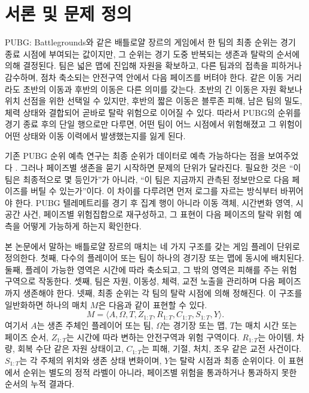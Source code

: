 \section{서론 및 문제 정의}
\label{sec:problem}

PUBG: Battlegrounds와 같은 배틀로얄 장르의 게임에서 한 팀의 최종 순위는 경기
종료 시점에 부여되는 값이지만, 그 순위는 경기 도중 반복되는 생존과 탈락의
순서에 의해 결정된다. 팀은 넓은 맵에 진입해 자원을 확보하고, 다른 팀과의 접촉을
피하거나 감수하며, 점차 축소되는 안전구역 안에서 다음 페이즈를 버텨야 한다.
같은 이동 거리라도 초반의 이동과 후반의 이동은 다른 의미를 갖는다. 초반의 긴
이동은 자원 확보나 위치 선점을 위한 선택일 수 있지만, 후반의 짧은 이동은 블루존
피해, 남은 팀의 밀도, 체력 상태와 결합되어 곧바로 탈락 위험으로 이어질 수 있다.
따라서 PUBG의 순위를 경기 종료 후의 단일 행으로만 다루면, 어떤 팀이 어느
시점에서 위험해졌고 그 위험이 어떤 상태와 이동 이력에서 발생했는지를 잃게 된다.

기존 PUBG 순위 예측 연구는 최종 순위가 데이터로 예측 가능하다는 점을 보여주었다
\cite{kagglePubgFinishPlacement,rokad2019pubgPlacement,sen2021pubgFinalRank,lee2025pubgRank}.
그러나 페이즈별 생존을 묻기 시작하면 문제의 단위가 달라진다. 필요한 것은
``이 팀은 최종적으로 몇 등인가''가 아니라, ``이 팀은 지금까지 관측된 정보만으로
다음 페이즈를 버틸 수 있는가''이다. 이 차이를 다루려면 먼저 로그를 자르는 방식부터
바뀌어야 한다. PUBG 텔레메트리를 경기 후 집계 행이 아니라 이동 객체, 시간변화
영역, 시공간 사건, 페이즈별 위험집합으로 재구성하고, 그 표현이 다음
페이즈의 탈락 위험 예측을 어떻게 가능하게 하는지 확인한다.

본 논문에서 말하는 배틀로얄 장르의 매치는 네 가지 구조를 갖는 게임 플레이
단위로 정의한다. 첫째, 다수의 플레이어 또는 팀이 하나의 경기장 또는 맵에 동시에
배치된다. 둘째, 플레이 가능한 영역은 시간에 따라 축소되고, 그 밖의 영역은
피해를 주는 위험 구역으로 작동한다. 셋째, 팀은 자원, 이동성, 체력, 교전 노출을
관리하며 다음 페이즈까지 생존해야 한다. 넷째, 최종 순위는 각 팀의 탈락 시점에
의해 정해진다. 이 구조를 일반화하면 하나의 매치 \(M\)은 다음과 같이 표현할 수
있다.
\[
M=\langle A,\Omega,T,Z_{1:T},R_{1:T},C_{1:T},S_{1:T},Y\rangle .
\]
여기서 \(A\)는 생존 주체인 플레이어 또는 팀, \(\Omega\)는 경기장 또는 맵,
\(T\)는 매치 시간 또는 페이즈 순서, \(Z_{1:T}\)는 시간에 따라 변하는 안전구역과
위험 구역이다. \(R_{1:T}\)는 아이템, 차량, 회복 수단 같은 자원 상태이고,
\(C_{1:T}\)는 피해, 기절, 처치, 조우 같은 교전 사건이다. \(S_{1:T}\)는 각 주체의
위치와 생존 상태 변화이며, \(Y\)는 탈락 시점과 최종 순위이다. 이 표현에서 순위는
별도의 정적 라벨이 아니라, 페이즈별 위험을 통과하거나 통과하지 못한 순서의 누적
결과다.

